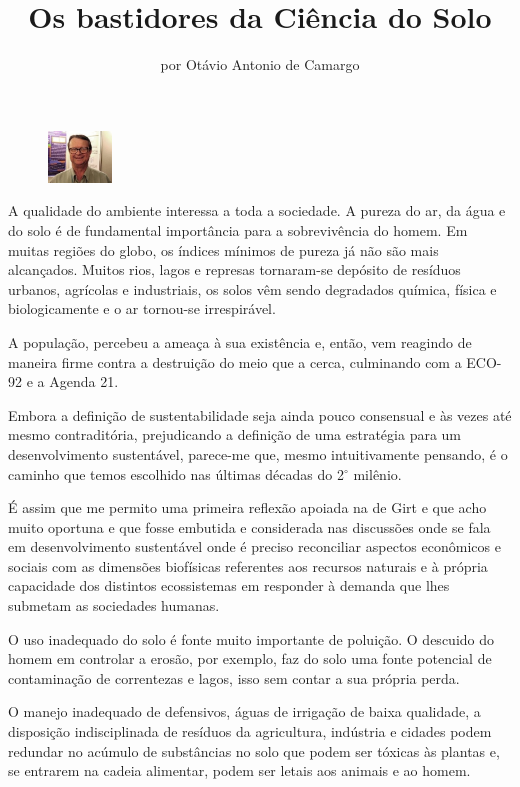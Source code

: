 \title{Os bastidores da Ciência do Solo}
\author{por Otávio Antonio de Camargo}
\maketitle
\begin{figure}
\includegraphics[width=0.15\textwidth]{figuras/foto-otavio-camargo}
\end{figure}

A qualidade do ambiente interessa a toda a sociedade.  A pureza do ar, da água e do solo é de fundamental importância para a sobrevivência do homem. Em muitas regiões do globo, os índices mínimos de pureza já não são mais alcançados. Muitos rios, lagos e represas tornaram-se depósito de resíduos urbanos, agrícolas e industriais, os solos vêm sendo degradados química, física e biologicamente e o ar tornou-se irrespirável.

A população,  percebeu a ameaça à sua existência e, então, vem reagindo de maneira firme contra a destruição do meio que a cerca, culminando com a ECO-92 e a Agenda 21.

Embora a definição de sustentabilidade seja ainda pouco consensual e às vezes até mesmo contraditória, prejudicando a definição de uma estratégia para um desenvolvimento sustentável, parece-me que, mesmo intuitivamente pensando, é o caminho que temos escolhido nas últimas décadas do 2$^\circ$ milênio.

É assim que me permito uma primeira reflexão apoiada na de Girt e que acho muito oportuna e que fosse embutida e considerada nas discussões onde se fala em desenvolvimento sustentável onde é preciso reconciliar aspectos econômicos e sociais com as dimensões biofísicas referentes aos recursos naturais e à própria capacidade dos distintos ecossistemas em responder à demanda que lhes submetam as sociedades humanas. 

O uso inadequado do solo é fonte muito importante de poluição. O descuido do homem em controlar a erosão, por exemplo, faz do solo uma fonte potencial de contaminação de correntezas e lagos, isso sem contar a sua própria perda.

O manejo inadequado de defensivos, águas de irrigação de baixa qualidade, a disposição indisciplinada de resíduos da agricultura, indústria e cidades podem redundar no acúmulo de substâncias no solo que podem ser tóxicas às plantas e, se entrarem na cadeia alimentar, podem ser letais aos animais e ao homem.


